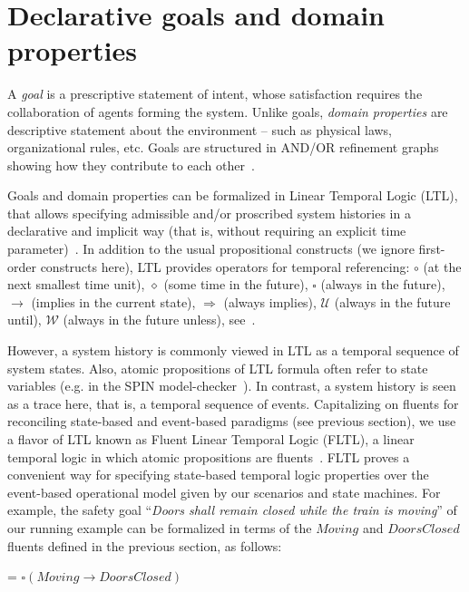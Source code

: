 \section{Declarative goals and domain properties\label{section:background-goals}}

A \emph{goal} is a prescriptive statement of intent, whose satisfaction requires the collaboration of agents forming the system. Unlike goals, \emph{domain properties} are descriptive statement about the environment -- such as physical laws, organizational rules, etc. Goals are structured in AND/OR refinement graphs showing how they contribute to each other~\cite{VanLamsweerde:2000}.

Goals and domain properties can be formalized in Linear Temporal Logic (LTL), that allows specifying admissible and/or proscribed system histories in a declarative and implicit way (that is, without requiring an explicit time parameter)~\cite{VanLamsweerde:2009}. In addition to the usual propositional constructs (we ignore first-order constructs here), LTL provides operators for temporal referencing: $\circ$ (at the next smallest time unit), $\diamond$ (some time in the future), $\square$ (always in the future), $\rightarrow$ (implies in the current state), $\Rightarrow$ (always implies), $\mathcal{U}$ (always in the future until), $\mathcal{W}$ (always in the future unless), see~\cite{Manna:1992}.

However, a system history is commonly viewed in LTL as a temporal sequence of system states. Also, atomic propositions of LTL formula often refer to state variables (e.g. in the SPIN model-checker~\cite{Holzmann:1997}). In contrast, a system history is seen as a trace here, that is, a temporal sequence of events. Capitalizing on fluents for reconciling state-based and event-based paradigms (see previous section), we use a flavor of LTL known as Fluent Linear Temporal Logic (FLTL), a linear temporal logic in which atomic propositions are fluents~\cite{Giannakopoulou:2003}. FLTL proves a convenient way for specifying state-based temporal logic properties over the event-based operational model given by our scenarios and state machines. For example, the safety goal ``\emph{Doors shall remain closed while the train is moving}'' of our running example can be formalized in terms of the $Moving$ and $DoorsClosed$ fluents defined in the previous section, as follows:

\begin{center}
 = $\square(Moving \rightarrow DoorsClosed)$
\end{center}

